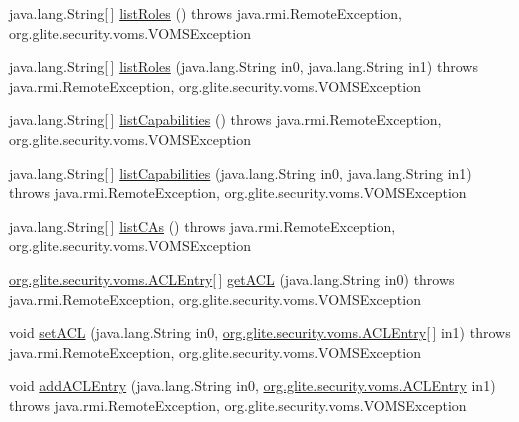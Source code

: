 \begin{DoxyCompactItemize}
\item 
java.lang.String\mbox{[}$\,$\mbox{]} \hyperlink{classorg_1_1glite_1_1security_1_1voms_1_1service_1_1admin_1_1VOMSAdminSoapBindingImpl_abf612303f644040873a1a736cc53336b}{listRoles} ()  throws java.rmi.RemoteException, org.glite.security.voms.VOMSException 
\item 
java.lang.String\mbox{[}$\,$\mbox{]} \hyperlink{classorg_1_1glite_1_1security_1_1voms_1_1service_1_1admin_1_1VOMSAdminSoapBindingImpl_a1ade79eb37d78963481d5f6152cdcba2}{listRoles} (java.lang.String in0, java.lang.String in1)  throws java.rmi.RemoteException, org.glite.security.voms.VOMSException 
\item 
java.lang.String\mbox{[}$\,$\mbox{]} \hyperlink{classorg_1_1glite_1_1security_1_1voms_1_1service_1_1admin_1_1VOMSAdminSoapBindingImpl_a7897e47c0fdf88505b8912b896dd39ce}{listCapabilities} ()  throws java.rmi.RemoteException, org.glite.security.voms.VOMSException 
\item 
java.lang.String\mbox{[}$\,$\mbox{]} \hyperlink{classorg_1_1glite_1_1security_1_1voms_1_1service_1_1admin_1_1VOMSAdminSoapBindingImpl_ac61094ba5f8f5d1414a00d95e5ead2e3}{listCapabilities} (java.lang.String in0, java.lang.String in1)  throws java.rmi.RemoteException, org.glite.security.voms.VOMSException 
\item 
java.lang.String\mbox{[}$\,$\mbox{]} \hyperlink{classorg_1_1glite_1_1security_1_1voms_1_1service_1_1admin_1_1VOMSAdminSoapBindingImpl_ac18dd0c7094f4457bf5e292b20edd1d9}{listCAs} ()  throws java.rmi.RemoteException, org.glite.security.voms.VOMSException 
\item 
\hyperlink{classorg_1_1glite_1_1security_1_1voms_1_1ACLEntry}{org.glite.security.voms.ACLEntry}\mbox{[}$\,$\mbox{]} \hyperlink{classorg_1_1glite_1_1security_1_1voms_1_1service_1_1admin_1_1VOMSAdminSoapBindingImpl_a5f3cb8635e79911ec843638299cfc370}{getACL} (java.lang.String in0)  throws java.rmi.RemoteException, org.glite.security.voms.VOMSException 
\item 
void \hyperlink{classorg_1_1glite_1_1security_1_1voms_1_1service_1_1admin_1_1VOMSAdminSoapBindingImpl_af5788ed58fb3d9868851940d43fcc5ed}{setACL} (java.lang.String in0, \hyperlink{classorg_1_1glite_1_1security_1_1voms_1_1ACLEntry}{org.glite.security.voms.ACLEntry}\mbox{[}$\,$\mbox{]} in1)  throws java.rmi.RemoteException, org.glite.security.voms.VOMSException 
\item 
void \hyperlink{classorg_1_1glite_1_1security_1_1voms_1_1service_1_1admin_1_1VOMSAdminSoapBindingImpl_aa5a0ba80361758e0e53383ea6e76778e}{addACLEntry} (java.lang.String in0, \hyperlink{classorg_1_1glite_1_1security_1_1voms_1_1ACLEntry}{org.glite.security.voms.ACLEntry} in1)  throws java.rmi.RemoteException, org.glite.security.voms.VOMSException 

\end{DoxyCompactItemize}
